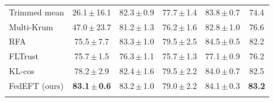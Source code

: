 \begin{table}[t]
\begin{tabular}{@{}lccccc@{}}
Trimmed mean & 26.1\,$\pm$\,16.1 & 82.3\,$\pm$\,0.9 & 77.7\,$\pm$\,1.4 & 83.8\,$\pm$\,0.7 & 74.4\\
Multi-Krum & 47.0\,$\pm$\,23.7 & 81.2\,$\pm$\,1.3 & 76.2\,$\pm$\,1.6 & 82.8\,$\pm$\,1.0 & 76.6\\
RFA & 75.5\,$\pm$\,7.7 & 83.3\,$\pm$\,1.0 & 79.5\,$\pm$\,2.5 & 84.5\,$\pm$\,0.5 & 82.2\\
FLTrust & 75.7\,$\pm$\,1.5 & 76.3\,$\pm$\,1.1 & 75.7\,$\pm$\,1.3 & 77.1\,$\pm$\,0.9 & 76.2\\
KL-cos & 78.2\,$\pm$\,2.9 & 82.4\,$\pm$\,1.6 & 79.5\,$\pm$\,2.2 & 84.0\,$\pm$\,0.7 & 82.5\\
\midrule
FedEFT (ours) & \textbf{83.1\,$\pm$\,0.6} & 83.2\,$\pm$\,1.0 & 79.0\,$\pm$\,2.2 & 84.1\,$\pm$\,0.3 & \textbf{83.2}\\
\botrule
\end{tabular}
\end{table}
